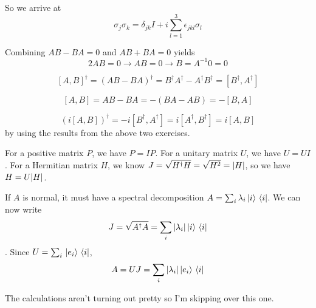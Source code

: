 So we arrive at 
$$\sigma_{j} \sigma_{k} = \delta_{jk} I + i \sum_{l=1}^{3} \epsilon_{jkl} \sigma_{l}$$

\exercise
Combining $AB - BA = 0$ and $AB + BA = 0$ yields
$$2AB = 0 \rightarrow AB = 0 \rightarrow B = A^{-1} 0 = 0$$

\exercise
$$[A, B]^{\dagger} = (AB - BA)^{\dagger} = B^{\dagger} A^{\dagger} - A^{\dagger} B^{\dagger} = [B^{\dagger}, A^{\dagger}]$$

\exercise
$$[A, B] = AB - BA = - (BA - AB) = - [B, A]$$

\exercise
$$( i [A, B])^{\dagger} = -i [B^{\dagger}, A^{\dagger}] = i[A^{\dagger}, B^{\dagger}] = i [A, B]$$
by using the results from the above two exercises. 

\exercise
For a positive matrix $P$, we have $P = IP$. 
For a unitary matrix $U$, we have $U = UI$. 
For a Hermitian matrix $H$, we know $J = \sqrt{H^{\dagger} H} = \sqrt{H^{2}} = \abs{H}$, so we have $H = U \abs{H}$. 

\exercise
If $A$ is normal, it must have a spectral decomposition $A = \sum_{i} \lambda_{i} \ket*{i} \bra*{i}$. We can now write 
$$J = \sqrt{A^{\dagger}A} = \sum_{i} \abs{\lambda_{i}} \ket*{i} \bra*{i}$$. 
Since $U = \sum_{i} \ket*{e_{i}} \bra*{i}$, 
$$A = UJ = \sum_{i} \abs{\lambda_{i}} \ket*{e_{i}} \bra*{i}$$

\exercise
The calculations aren't turning out pretty so I'm skipping over this one. 


